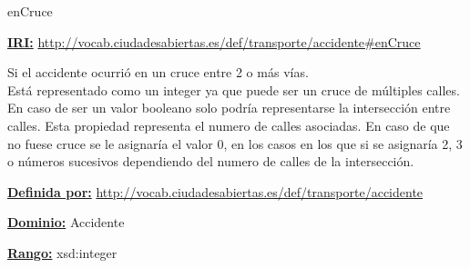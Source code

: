 \begin{mybox}{enCruce}
\begin{flushleft}
\underline{\textbf{IRI:}}
\url{http://vocab.ciudadesabiertas.es/def/transporte/accidente#enCruce}
\newline

Si el accidente ocurrió en un cruce entre 2 o más vías.
\\Está representado como un integer ya que puede ser un cruce de múltiples calles. En caso de ser un valor booleano solo podría representarse la intersección entre calles. Esta propiedad representa el numero de calles asociadas. En caso de que no fuese cruce se le asignaría el valor 0, en los casos en los que si se asignaría 2, 3 o números sucesivos dependiendo del numero de calles de la intersección.
\newline

\underline{\textbf{Definida por:}}\newline
\url{http://vocab.ciudadesabiertas.es/def/transporte/accidente}
\newline

\underline{\textbf{Dominio:}} 	Accidente
\newline

\underline{\textbf{Rango:}} 	xsd:integer
\newline

\end{flushleft}
\end{mybox}








